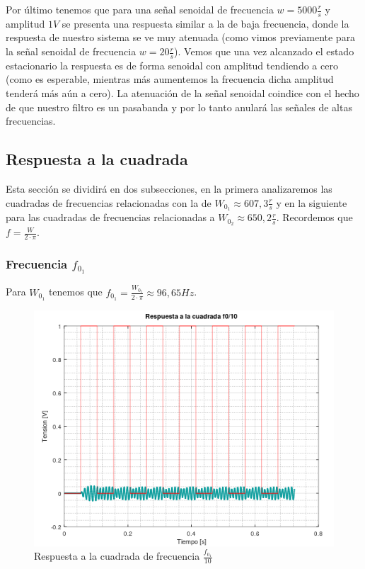 \documentclass[11pt,a4paper]{report}
\begin{document}
Por último tenemos que para una señal senoidal de frecuencia $w = 5000\frac{r}{s}$ y amplitud $1V$ se presenta una respuesta similar a la de baja frecuencia, donde la respuesta de nuestro sistema se ve muy atenuada (como vimos previamente para la señal senoidal de frecuencia $w = 20\frac{r}{s}$). Vemos que una vez alcanzado el estado
estacionario la respuesta es de forma senoidal con amplitud tendiendo a cero (como es esperable, mientras más aumentemos la frecuencia dicha amplitud tenderá más aún a cero). La atenuación de la señal senoidal coindice con el hecho de que nuestro filtro es un pasabanda y por lo tanto anulará las señales de altas frecuencias.

\newpage
\subsection*{Respuesta a la cuadrada}

Esta sección se dividirá en dos subsecciones, en la primera analizaremos las cuadradas de frecuencias relacionadas con la de $W_{0_{1}} \approx 607,3 \frac{r}{s}$ y en la siguiente para las cuadradas de frecuencias relacionadas a $W_{0_{2}} \approx 650,2 \frac{r}{s}$. Recordemos que $f = \frac{W}{2 \cdot \pi}$.

\subsubsection*{Frecuencia $f_{0_{1}}$}

Para $W_{0_{1}}$ tenemos que $f_{0_{1}} = \frac{W_{0_{1}}}{2 \cdot \pi} \approx 96,65Hz$.

\begin{figure}[h!]
\includegraphics[scale=1]{RtaCuadradaWo11.png}
\caption{Respuesta a la cuadrada de frecuencia $\frac{f_{0_{1}}}{10}$}
\end{figure}
\end{document}
